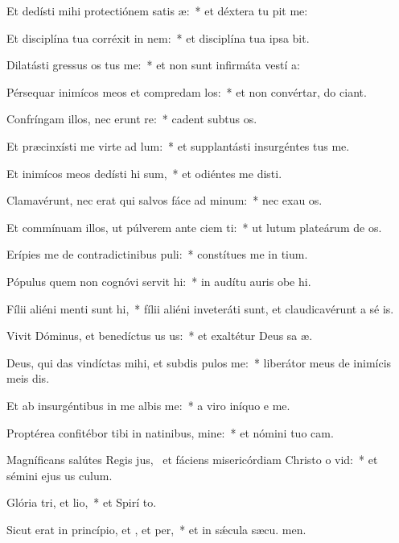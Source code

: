 \item Et dedísti mihi protectiónem satis æ:~* et déxtera tu pit me:
\item Et disciplína tua corréxit  in nem:~* et disciplína tua ipsa  bit.
\item Dilatásti gressus os tus me:~* et non sunt infirmáta vestí a:
\item Pérsequar inimícos meos et compredam los:~* et non convértar, do ciant.
\item Confríngam illos, nec erunt re:~* cadent subtus  os.
\item Et præcinxísti me virte ad lum:~* et supplantásti insurgéntes   tus me.
\item Et inimícos meos dedísti hi sum,~* et odiéntes me disti.
\item Clamavérunt, nec erat qui salvos fáce ad minum:~* nec exau os.
\item Et commínuam illos, ut púlverem ante ciem ti:~* ut lutum plateárum de os.
\item Erípies me de contradictinibus puli:~* constítues me in  tium.
\item Pópulus quem non cognóvi servit hi:~* in audítu auris obe hi.
\item Fílii aliéni menti sunt hi,~* fílii aliéni inveteráti sunt, et claudicavérunt a sé is.
\item Vivit Dóminus, et benedíctus us us:~* et exaltétur Deus sa æ.
\item Deus, qui das vindíctas mihi, et subdis pulos  me:~* liberátor meus de inimícis meis dis.
\item Et ab insurgéntibus in me albis me:~* a viro iníquo e me.
\item Proptérea confitébor tibi in natinibus, mine:~* et nómini tuo  cam.
\item Magníficans salútes Regis jus,~\pscross{} et fáciens misericórdiam Christo o vid:~* et sémini ejus us  culum.
\item Glória tri, et lio,~* et Spirí to.
\item Sicut erat in princípio, et , et per,~* et in sǽcula sæcu. men.
